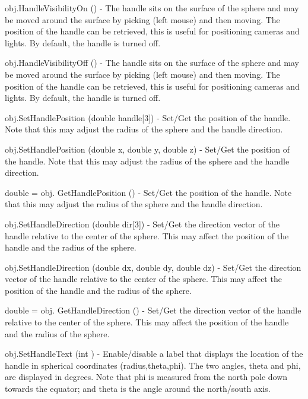 \begin{DoxyItemize}
\item {\ttfamily obj.\-Handle\-Visibility\-On ()} -\/ The handle sits on the surface of the sphere and may be moved around the surface by picking (left mouse) and then moving. The position of the handle can be retrieved, this is useful for positioning cameras and lights. By default, the handle is turned off.  
\item {\ttfamily obj.\-Handle\-Visibility\-Off ()} -\/ The handle sits on the surface of the sphere and may be moved around the surface by picking (left mouse) and then moving. The position of the handle can be retrieved, this is useful for positioning cameras and lights. By default, the handle is turned off.  
\item {\ttfamily obj.\-Set\-Handle\-Position (double handle\mbox{[}3\mbox{]})} -\/ Set/\-Get the position of the handle. Note that this may adjust the radius of the sphere and the handle direction.  
\item {\ttfamily obj.\-Set\-Handle\-Position (double x, double y, double z)} -\/ Set/\-Get the position of the handle. Note that this may adjust the radius of the sphere and the handle direction.  
\item {\ttfamily double = obj. Get\-Handle\-Position ()} -\/ Set/\-Get the position of the handle. Note that this may adjust the radius of the sphere and the handle direction.  
\item {\ttfamily obj.\-Set\-Handle\-Direction (double dir\mbox{[}3\mbox{]})} -\/ Set/\-Get the direction vector of the handle relative to the center of the sphere. This may affect the position of the handle and the radius of the sphere.  
\item {\ttfamily obj.\-Set\-Handle\-Direction (double dx, double dy, double dz)} -\/ Set/\-Get the direction vector of the handle relative to the center of the sphere. This may affect the position of the handle and the radius of the sphere.  
\item {\ttfamily double = obj. Get\-Handle\-Direction ()} -\/ Set/\-Get the direction vector of the handle relative to the center of the sphere. This may affect the position of the handle and the radius of the sphere.  
\item {\ttfamily obj.\-Set\-Handle\-Text (int )} -\/ Enable/disable a label that displays the location of the handle in spherical coordinates (radius,theta,phi). The two angles, theta and phi, are displayed in degrees. Note that phi is measured from the north pole down towards the equator; and theta is the angle around the north/south axis.  

\end{DoxyItemize}
